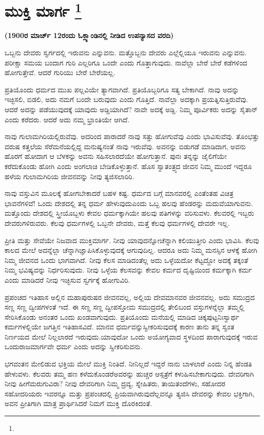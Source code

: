 
\chapter[ಮುಕ್ತಿ ಮಾರ್ಗ ]{ಮುಕ್ತಿ ಮಾರ್ಗ \protect\footnote{}}

\centerline{\textbf{(1900ರ ಮಾರ್ಚ್​ 12ರಂದು ಓಕ್ಲ್ಯಾಂಡಿನಲ್ಲಿ ನೀಡಿದ ಉಪನ್ಯಾಸದ ವರದಿ)}}

ಒಬ್ಬನು ದೇವರು ಸ್ವರ್ಗದಲ್ಲಿ ಇರುವನು ಎನ್ನುವನು. ಮತ್ತೊಬ್ಬನು ದೇವರು ಎಲ್ಲೆಲ್ಲಿಯೂ ಇರುವನು ಎನ್ನುವನು. ಪರೀಕ್ಷಾ ಸಮಯ ಬಂದಾಗ ಗುರಿ ಎಲ್ಲರಿಗೂ ಒಂದೇ ಎಂದು ಗೊತ್ತಾಗುವುದು. ನಾವೆಲ್ಲಾ ಬೇರೆ ಬೇರೆ ಕಡೆಗಳಿಂದ ಹೋಗುತ್ತೇವೆ. ಆದರೆ ಗುರಿಯು ಬೇರೆ ಬೇರೆಯಲ್ಲ.

ಪ್ರತಿಯೊಂದು ಧರ್ಮದ ಮುಖ ಪಲ್ಲವಿಯೇ ತ್ಯಾಗವಾಗಿದೆ. ಪ್ರತಿಯೊಬ್ಬರಿಗೂ ಸತ್ಯ ಬೇಕಾಗಿದೆ. ನಾವು ಅದನ್ನು ಇಚ್ಛಿಸಲಿ, ಬಿಡಲಿ, ಅದು ನಮಗೆ ಬಂದೇ ಬರುವುದು ಎಂದು ಗೊತ್ತಿದೆ. ನಾವೆಲ್ಲಾ ಅದಕ್ಕಾಗಿ ಪ್ರಯತ್ನಿಸುತ್ತಿರುವೆವು. ಆದರೆ ಅದನ್ನು ಪಡೆಯುವುದಕ್ಕೆ ಯಾವುದು ಅಡ್ಡಿಯಾಗಿದೆ? ನಾವೇ ಅದಕ್ಕೆ ಅಡ್ಡಿ. ನಿಮ್ಮ ಪೂರ್ವಿಕರು ಅದನ್ನು ಸೈತಾನ್​ ಎಂದು ಕರೆದರು. ಆದರೆ ಅದು ನಮ್ಮ ಭ್ರಾಂತಿಯೇ ಆಗಿದೆ.

ನಾವು ಗುಲಾಮಗಿರಿಯಲ್ಲಿರುವೆವು. ಅದರಿಂದ ಪಾರಾದರೆ ನಾವು ಸತ್ತು ಹೋಗುವೆವು ಎಂದು ಭಾವಿಸುವೆವು. ತೊಂಭತ್ತು ವರುಷ ಕತ್ತಲೆಯ ಸೆರೆಮನೆಯಲ್ಲಿದ್ದ ಮನುಷ್ಯನಂತೆ ನಾವು ಇರುವೆವು. ಅವನನ್ನು ಬಿಡುಗಡೆ ಮಾಡಿದಾಗ, ಅವನು ಹೊರಗೆ ಹೋದಾಗ ಆ ಬೆಳಕನ್ನು ಅವನು ಸಹಿಸಲಾರದೆಯೇ ಹೋಗುತ್ತಾನೆ. ಪುನಃ ತನ್ನನ್ನು ಜೈಲಿಗೆಯೇ ಕರೆದುಕೊಂಡು ಹೋಗಿ ಎಂದು ಅಂಗಲಾಚಿ ಬೇಡಿಕೊಳ್ಳುತ್ತಾನೆ. ಹೊಸ ಸ್ವಾತಂತ್ರ್ಯದ ಜೀವನ ನಿಮ್ಮ ಮುಂದೆ ಇದ್ದರೂ ಹಳೆಯ ಗುಲಾಮಗಿರಿಯ ಜೀವನವನ್ನು ನೀವು ತ್ಯಜಿಸಲಾರಿರಿ.

ನಾವು ವಸ್ತುವಿನ ಮೂಲಕ್ಕೆ ಹೋಗಬೇಕಾದರೆ ಬಹಳ ಕಷ್ಟ. ಧರ್ಮದ ಬಗ್ಗೆ ಮಾನವರಲ್ಲಿ ಎಂತೆಂತಹ ವಿಚಿತ್ರ ಭಾವನೆಗಳಿವೆ! ಒಂದು ದೇಶದಲ್ಲಿ ತನ್ನ ಧರ್ಮ ಹೇಳುವುದು\break ಎಂದು ಒಬ್ಬ ಹಲವು ಹೆಂಡರನ್ನು ಮದುವೆಯಾಗುವನು. ಮತ್ತೊಂದು ದೇಶದಲ್ಲಿ ಸ್ತ್ರೀಯೊಬ್ಬಳು ಕೇವಲ ಧರ್ಮಕ್ಕಾಗಿಯೇ ಹಲವು ಪತಿಗಳನ್ನು ವರಿಸುವಳು. ಕೆಲವರಲ್ಲಿ ಇಬ್ಬರು ದೇವರುಗಳಿರುವರು. ಕೆಲವು ಧರ್ಮಗಳಲ್ಲಿ ಒಬ್ಬನೇ ದೇವರು, ಮತ್ತೆ ಕೆಲವು ಧರ್ಮಗಳಲ್ಲಿ ದೇವರೇ ಇಲ್ಲ.

ಪ್ರೀತಿ ಮತ್ತು ಸೇವೆಯೇ ನಿಜವಾದ ಮುಕ್ತಿಮಾರ್ಗ. ನೀವು ಯಾವುದನ್ನೋ\break ಚೆನ್ನಾಗಿ ಕಲಿಯುತ್ತೀರಿ ಎಂದು ಭಾವಿಸಿ. ಕೆಲವು ಕಾಲದ ಮೇಲೆ ಅದನ್ನೆಲ್ಲಾ ಚೆನ್ನಾಗಿ\break ಜ್ಞಾಪಿಸಿಕೊಳ್ಳುವುದಕ್ಕೆ ಆಗುವುದಿಲ್ಲ. ಆದರೂ ಅದು ನಿಮ್ಮ ಮನಸ್ಸಿನ ಆಳಕ್ಕೆ ಹೋಗಿ ನಿಮ್ಮ ಜೀವನದ ಒಂದು ಭಾಗವಾಗಿದೆ. ನೀವು ಕೆಲಸ ಮಾಡಿದಂತೆಲ್ಲ ಅದು ಒಳ್ಳೆಯದೋ ಕೆಟ್ಟದ್ದೋ ಅದಕ್ಕೆ ತಕ್ಕಂತೆ ನಿಮ್ಮ ಭವಿಷ್ಯವನ್ನು ನಿರ್ಧರಿಸುವುದು. ನೀವು ಒಳ್ಳೆಯ ಕೆಲಸವನ್ನು ಕೇವಲ ಕರ್ಮದ ದೃಷ್ಟಿಯಿಂದ ಕರ್ಮಕ್ಕಾಗಿ ಕರ್ಮ ಎಂದು ಮಾಡಿದರೆ ನೀವು ಇಚ್ಛಿಸುವ ಸ್ವರ್ಗಕ್ಕೆ ಹೋಗುವಿರಿ.

ಪ್ರಪಂಚದ ಇತಿಹಾಸ ಅಲ್ಲಿನ ಮಹಾಪುರುಷರ ಜೀವನವಲ್ಲ, ಅಲ್ಲಿಯ ದೇವಮಾನವರ ಜೀವನವಲ್ಲ. ಅದು ಸಮುದ್ರದ ಸಣ್ಣ ಸಣ್ಣ ದ್ವೀಪಗಳಂತೆ ಇದೆ. ಈ ಸಣ್ಣ ಸಣ್ಣ ದ್ವೀಪಸ್ತೋಮ ಸಮುದ್ರದಲ್ಲಿ ತೇಲಿಬಂದ ವಸ್ತುಗಳನ್ನೆಲ್ಲಾ ತಮ್ಮಲ್ಲಿ ಸೇರಿಸಿಕೊಂಡು ಅನಂತರ ಒಂದು ಖಂಡವಾಗುವುದು. ಪ್ರತಿಯೊಂದು ಮನೆಯಲ್ಲಿ ಮಾಡಿದ ಚಿಕ್ಕಪುಟ್ಟ\break ನಿಃಸ್ವಾರ್ಥ ಕರ್ಮಗಳಲ್ಲಿಯೇ ಜಗತ್ತಿನ ಇತಿಹಾಸವಿದೆ. ಮಾನವ ಧರ್ಮವನ್ನು\break ಸ್ವೀಕರಿಸುವುದಕ್ಕೆ ಕಾರಣ ತಾನು ತನ್ನ ಸ್ವಂತ ನಿರ್ಣಯದ ಮೇಲೆ ನಿಲ್ಲಲಾರದೆ ಇರುವುದು.\break ಯಾವುದೋ ಒಂದು ಅಯೋಗ್ಯವಾದ ಸ್ಥಳದಿಂದ ಪಾರಾಗುವುದಕ್ಕೆ ಇರುವ ಒಂದು\break ರಾಜಮಾರ್ಗವೇ ಧರ್ಮ ಎಂದು ಅದನ್ನು ಸ್ವೀಕರಿಸುವನು.

ಭಗವಂತನ ಮೇಲಿಡುವ ಭಕ್ತಿಯ ಮೇಲೆ ಮುಕ್ತಿ ನಿಂತಿದೆ. ನೀನಿಲ್ಲದೆ ಇದ್ದರೆ ನಾನು ಬಾಳಲಾರೆ ಎಂದು ನಿನ್ನ ಹೆಂಡತಿ ಹೇಳುವಳು. ಕೆಲವರು ತಮ್ಮ ಹಣ ಕಳೆದುಕೊಂಡರೆ\break ಅವರನ್ನು ಹುಚ್ಚರ ಆಸ್ಪತ್ರೆಗೆ ಕಳುಹಿಸಬೇಕಾಗುವುದು. ದೇವರಿಗಾಗಿ ನೀವು ಹೀಗೆ\break ಮರುಗುವಿರಾ? ನೀವು ದೇವರಿಗಾಗಿ ನಿಮ್ಮ ದ್ರವ್ಯ, ಸ್ನೇಹಿತರು, ತಾಯಿತಂದೆಗಳು, ಸಹೋದರ ಸಹೋದರಿಯರು ಇವರನ್ನೂ ಮತ್ತು ಪ್ರಪಂಚದಲ್ಲಿ ಪ್ರಿಯವಾಗಿರುವುದೆಲ್ಲವನ್ನೂ ತ್ಯಜಿಸಿ ದೇವರನ್ನು ಕೇವಲ ಭಕ್ತಿಗಾಗಿ, ಅವನ ಪ್ರೀತಿಗಾಗಿ ಮಾತ್ರ ಪ್ರಾರ್ಥಿಸಿದರೆ ನಿಮಗೆ ಮುಕ್ತಿ ದೊರಕಿದಂತೆ.

